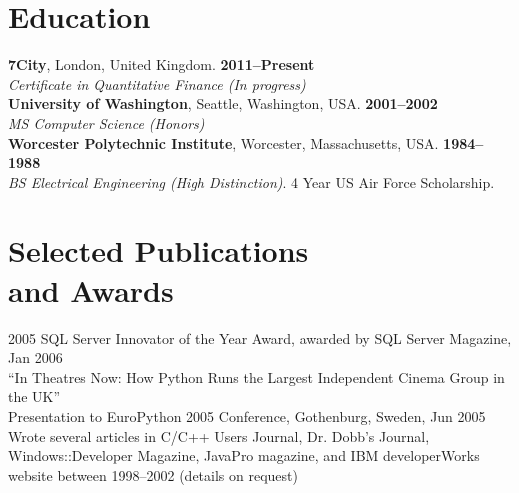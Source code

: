 \documentclass[margin,line]{resume}
\begin{document}
\begin{resume}
    \section{\mysidestyle Education}
	\textbf{7City}, London, United Kingdom. \hfill \textbf{2011--Present}\\
	\textsl{Certificate in Quantitative Finance (In progress)}\\
	\textbf{University of Washington}, Seattle, Washington, USA. \hfill \textbf{2001--2002}\\
	\textsl{MS Computer Science (Honors)} \\
	\textbf{Worcester Polytechnic Institute}, Worcester, Massachusetts, USA. \hfill \textbf{1984--1988}\\
	\textsl{BS Electrical Engineering (High Distinction)}. 4 Year US Air Force Scholarship. 

    \section{\mysidestyle Selected Publications\\ and Awards} 

	2005 SQL Server Innovator of the Year Award, awarded by SQL Server Magazine, Jan 2006\vspace{1mm}\\%
	``In Theatres Now: How Python Runs the Largest Independent Cinema Group in the UK''\\
	Presentation to EuroPython 2005 Conference, Gothenburg, Sweden, Jun 2005\vspace{1mm}\\
	Wrote several articles in C/C++ Users Journal, Dr. Dobb's Journal, Windows::Developer Magazine,
	JavaPro magazine, and IBM developerWorks website between 1998--2002 (details on request)
	

\end{resume}
\end{document}
